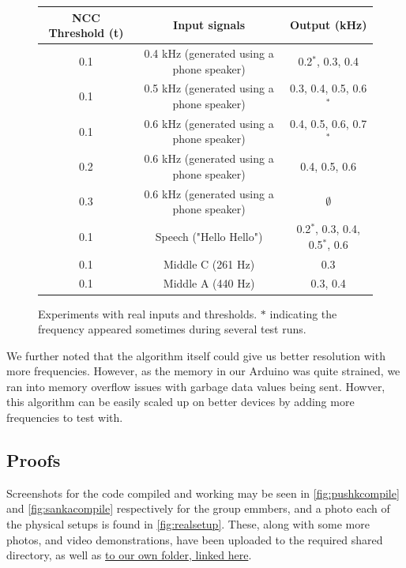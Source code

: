 \begin{figure}[ht]
    \centering
    \def\arraystretch{1.5}
    \setlength\tabcolsep{2em}
    \begin{tabular}{c | c | c}
        NCC Threshold (t)   & Input signals                                 & Output (kHz) \\ \hline
        0.1                 & 0.4 kHz (generated using a phone speaker)     & 0.2$^\ast$, 0.3, 0.4 \\   
        0.1                 & 0.5 kHz (generated using a phone speaker)     & 0.3, 0.4, 0.5, 0.6$^\ast$ \\   
        0.1                 & 0.6 kHz (generated using a phone speaker)     & 0.4, 0.5, 0.6, 0.7$^\ast$ \\   
        0.2                 & 0.6 kHz (generated using a phone speaker)     & 0.4, 0.5, 0.6 \\   
        0.3                 & 0.6 kHz (generated using a phone speaker)     & $\emptyset$ \\  
        0.1                 & Speech ("Hello Hello")                        & 0.2$^\ast$, 0.3, 0.4, 0.5$^\ast$, 0.6 \\   
        0.1                 & Middle C (261 Hz)                             & 0.3 \\   
        0.1                 & Middle A (440 Hz)                             & 0.3, 0.4 
    \end{tabular}
    \captionsetup{justification=centering}
    \caption{Experiments with real inputs and thresholds. $\ast$ indicating the frequency appeared sometimes during several test runs.}
    \label{fig:realexp}

\end{figure}
We further noted that the algorithm itself could give us better resolution with more frequencies. However, as the memory in our Arduino was quite strained, we ran into memory overflow issues with garbage data values being sent. Howver, this algorithm can be easily scaled up on better devices by adding more frequencies to test with. 

\subsection{Proofs}

Screenshots for the code compiled and working may be seen in
\autoref{fig:pushkcompile} and \autoref{fig:sankacompile} respectively for the
group emmbers, and a photo each of the physical setups is found in
\autoref{fig:realsetup}. These, along with some more photos, and video
demonstrations, have been uploaded to the required shared directory, as well as
\href{https://drive.google.com/drive/folders/1jjNn4WWWuB7WvTU04xIGaotz5W_Lfz55?usp=sharing}{to
our own folder, linked here}.

